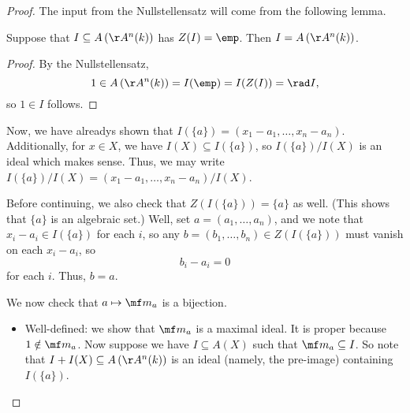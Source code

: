 \begin{proof}
	The input from the Nullstellensatz will come from the following lemma.
	\begin{lemma} \label{lem:zeroempty}
		Suppose that $I\subseteq A\left(\AA^n(k)\right)$ has $Z(I)=\emp$. Then $I=A\left(\AA^n(k)\right)$.
	\end{lemma}
	\begin{proof}
		By the Nullstellensatz,
		\[1\in A\left(\AA^n(k)\right)=I(\emp)=I(Z(I))=\rad I,\]
		so $1\in I$ follows.
	\end{proof}
	Now, we have alreadys shown that $I(\{a\})=(x_1-a_1,\ldots,x_n-a_n)$. Additionally, for $x\in X$, we have $I(X)\subseteq I(\{a\})$, so $I(\{a\})/I(X)$ is an ideal which makes sense. Thus, we may write $I(\{a\})/I(X)=(x_1-a_1,\ldots,x_n-a_n)/I(X)$.
	
	Before continuing, we also check that $Z(I(\{a\}))=\{a\}$ as well. (This shows that $\{a\}$ is an algebraic set.) Well, set $a=(a_1,\ldots,a_n)$, and we note that $x_i-a_i\in I(\{a\})$ for each $i$, so any $b=(b_1,\ldots,b_n)\in Z(I(\{a\}))$ must vanish on each $x_i-a_i$, so
	\[b_i-a_i=0\]
	for each $i$. Thus, $b=a$.

	We now check that $a\mapsto\mf m_a$ is a bijection.
	\begin{itemize}
		\item Well-defined: we show that $\mf m_a$ is a maximal ideal. It is proper because $1\notin\mf m_a$. Now suppose we have $I\subseteq A(X)$ such that $\mf m_a\subseteq I$. So note that $I+I(X)\subseteq A\left(\AA^n(k)\right)$ is an ideal (namely, the pre-image) containing $I(\{a\})$.


\end{itemize}
\end{proof}
